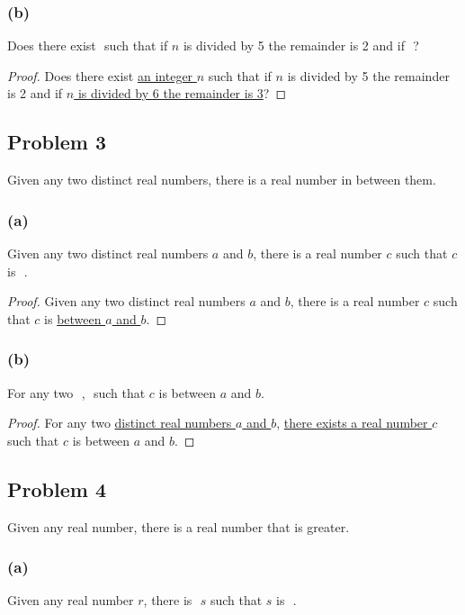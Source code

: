\documentclass[14pt]{extarticle}
\newcommand{\fbl}{\underline{\hspace{1cm}}\,\,}
\begin{document}
\subsubsection{(b)}
Does there exist \fbl such that if $n$ is divided by 5 the remainder is 2 and if \fbl?

\begin{proof}
Does there exist \underline{an integer $n$} such that if $n$ is
divided by 5 the remainder is 2 and if \underline{$n$ is divided by 6 the
remainder is 3}?
\end{proof}

\subsection{Problem 3}
Given any two distinct real numbers,
there is a real number in between them.

\subsubsection{(a)}
Given any two distinct real numbers $a$ and $b$,
there is a real number $c$ such that $c$ is \fbl.

\begin{proof}
Given any two distinct real numbers $a$ and $b$, there is a real number $c$ such
that $c$ is \underline{between $a$ and $b$}.
\end{proof}

\subsubsection{(b)}
For any two \fbl, \fbl such that $c$ is between $a$ and $b$.

\begin{proof}
For any two \underline{distinct real numbers $a$ and $b$}, \underline{there
exists a real number $c$} such that $c$ is between $a$ and $b$.
\end{proof}

\subsection{Problem 4}
Given any real number, there is a real number that is greater.

\subsubsection{(a)}
Given any real number $r$, there is \fbl $s$ such that $s$ is \fbl.
\end{document}
